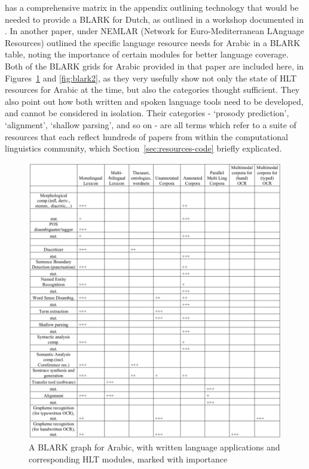 \citet{krauwer2003basic} has a comprehensive matrix in the appendix outlining technology that would be needed to provide a BLARK for Dutch, as outlined in a workshop documented in \citet{binnenpoorte2002towards}. In another paper, \citet{maegaard2006blark} under NEMLAR (Network  for  Euro-Mediterranean  LAnguage  Resources) outlined the specific language resource needs for Arabic in a BLARK table, noting the importance of certain modules for better language coverage. Both of the BLARK grids for Arabic provided in that paper are included here, in Figures~\ref{fig:blark1} and \ref{fig:blark2}, as they very usefully show not only the state of HLT resources for Arabic at the time, but also the categories thought sufficient. They also point out how both written and spoken language tools need to be developed, and cannot be considered in isolation. Their categories - `prosody prediction', `alignment', `shallow parsing', and so on - are all terms which refer to a suite of resources that each reflect hundreds of papers from within the computational linguistics community, which Section~\ref{sec:resources-code} briefly explicated.

\begin{figure}
 \centering
 \includegraphics[width=1\textwidth]{img/blark1.png}
 \caption{A BLARK graph for Arabic, with written language applications and corresponding HLT modules, marked with importance \citep[775]{maegaard2006blark}}
 \label{fig:blark1}
\end{figure}

